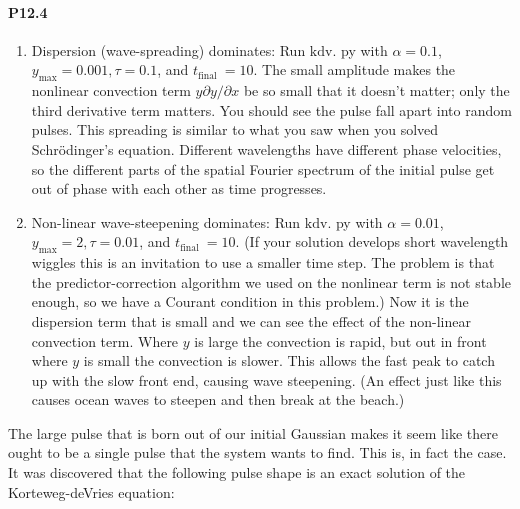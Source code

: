 \documentclass{book}
\theoremstyle{plain}
\theoremstyle{definition}
\numberwithin{exm}{chapter}
\theoremstyle{remark}
\theoremstyle{summary}
\theoremstyle{overview}
\begin{document}
\paragraph*{P12.4}
\begin{enumerate}[label=(\alph*)]
\item Dispersion (wave-spreading) dominates: Run $\mathrm{kdv}$. py with $\alpha=0.1$, $y_{\max }=0.001, \tau=0.1$, and $t_{\text {final }}=10$. The small amplitude makes the nonlinear convection term $y \partial y / \partial x$ be so small that it doesn't matter; only the third derivative term matters. You should see the pulse fall apart into random pulses. This spreading is similar to what you saw when you solved Schrödinger's equation. Different wavelengths have different phase velocities, so the different parts of the spatial Fourier spectrum of the initial pulse get out of phase with each other as time progresses.
\item Non-linear wave-steepening dominates: Run $\mathrm{kdv}$. py with $\alpha=0.01$, $y_{\max }=2, \tau=0.01$, and $t_{\text {final }}=10$. (If your solution develops short wavelength wiggles this is an invitation to use a smaller time step. The problem is that the predictor-correction algorithm we used on the nonlinear term is not stable enough, so we have a Courant condition in this problem.)
Now it is the dispersion term that is small and we can see the effect of the non-linear convection term. Where $y$ is large the convection is rapid, but out in front where $y$ is small the convection is slower. This allows the fast peak to catch up with the slow front end, causing wave steepening. (An effect just like this causes ocean waves to steepen and then break at the beach.)
\end{enumerate}
The large pulse that is born out of our initial Gaussian makes it seem like
there ought to be a single pulse that the system wants to find. This is, in fact the
case. It was discovered that the following pulse shape is an exact solution of the
Korteweg-deVries equation:

\end{document}
